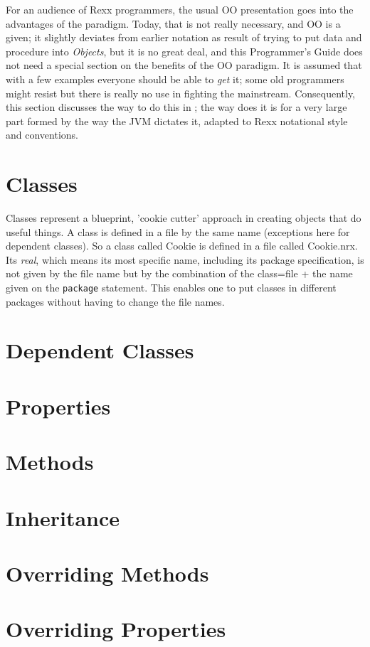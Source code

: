 {{For an audience of Rexx programmers, the usual OO presentation goes
into the advantages of the paradigm. Today, that is not really
necessary, and OO is a given; it slightly deviates from earlier
notation as result of trying to put data and procedure into
\emph{Objects}, but it is no great deal, and this \nr{} Programmer's
Guide does not need a special section on the benefits of the OO
paradigm. It is assumed that with a few examples everyone should be
able to \emph{get} it; some old programmers might resist but there is
really no use in fighting the mainstream. Consequently, this section
discusses the way to do this in \nr{}; the way \nr{} does it is for a very
large part formed by the way the JVM dictates it, adapted to Rexx
notational style and conventions.

\section{Classes}
Classes represent a blueprint, 'cookie cutter' approach in creating
objects that do useful things. A class is defined in a file by the
same name (exceptions here for dependent classes). So a class called
Cookie is defined in a file called Cookie.nrx. Its \emph{real}, which
means its most specific name, including its package specification, is
not given by the file name but by the combination of the class=file +
the name given on the \texttt{package} statement. This enables one to
put classes in different packages without having to change the file
names.

\section{Dependent Classes}

\section{Properties}
\section{Methods}
\section{Inheritance}
\section{Overriding Methods}
\section{Overriding Properties}
}}
